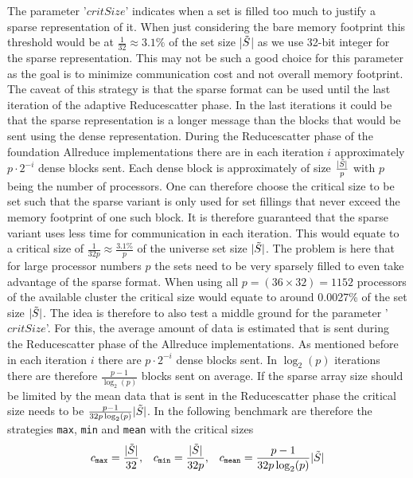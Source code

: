 The parameter '$critSize$' indicates when a set is filled too much to justify a sparse representation of it. When just considering the bare memory footprint this threshold would be at $\frac{1}{32}\approx3.1\%$ of the set size |$\Tilde{S}$| as we use 32-bit integer for the sparse representation. This may not be such a good choice for this parameter as the goal is to minimize communication cost and not overall memory footprint. The caveat of this strategy is that the sparse format can be used until the last iteration of the adaptive Reducescatter phase. In the last iterations it could be that the sparse representation is a longer message than the blocks that would be sent using the dense representation. During the Reducescatter phase of the foundation Allreduce implementations there are in each iteration $i$ approximately $p\cdot 2^{-i}$ dense blocks sent. Each dense block is approximately of size $\frac{|\Tilde{S}|}{p}$ with $p$ being the number of processors. One can therefore choose the critical size to be set such that the sparse variant is only used for set fillings that never exceed the memory footprint of one such block. It is therefore guaranteed that the sparse variant uses less time for communication in each iteration. This would equate to a critical size of $\frac{1}{32p}\approx\frac{3.1\%}{p}$ of the universe set size $|\Tilde{S}|$. The problem is here that for large processor numbers $p$ the sets need to be very sparsely filled to even take advantage of the sparse format. When using all $p=(36\times32)=1152$ processors of the available cluster the critical size would equate to around 0.0027\% of the  set size $|\Tilde{S}|$. The idea is therefore to also test a middle ground for the parameter '$critSize$'. For this, the average amount of data is estimated that is sent during the Reducescatter phase of the Allreduce implementations. As mentioned before in each iteration $i$ there are $p\cdot 2^{-i}$ dense blocks sent. In $\log_2(p)$ iterations there are therefore $\frac{p-1}{\log_2(p)}$ blocks sent on average. If the sparse array size should be limited by the mean data that is sent in the Reducescatter phase the critical size needs to be $\frac{p-1}{32p\log_2(p)} |\Tilde{S}|$. In the following benchmark are therefore the strategies \texttt{max}, \texttt{min} and \texttt{mean} with the critical sizes 
\begin{align*}
	c_\texttt{max} = \frac{|\Tilde{S}|}{32}, && c_\texttt{min}= \frac{|\Tilde{S}|}{32p},
	&& c_\texttt{mean} = \frac{p-1}{32 p \log_2(p)} |\Tilde{S}|
\end{align*}
